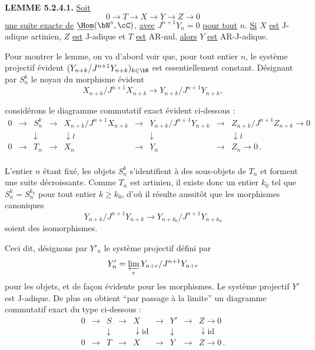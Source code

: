 \noindent
\textbf{LEMME 5.2.4.1.} \underline{Soit}
\[
0 \longrightarrow T \longrightarrow X \longrightarrow Y \longrightarrow Z \longrightarrow 0
\]
\underline{une suite exacte de} $\underline{\Hom}(\bN^{\circ}, \cC)$, \underline{avec} $J^{n+1}Y_n = 0$ \underline{pour tout} $n$. \underline{Si} $X$ \underline{est} J-adique artinien, $Z$ \underline{est} J-adique et $T$ \underline{est} AR-nul, \underline{alors} $Y$ \underline{est} AR-J-adique.

Pour montrer le lemme, on va d'abord voir que, pour tout entier $n$, le syst\`eme projectif \'evident $(Y_{n+k}/J^{n+1}Y_{n+k})_{k \in \bN}$ est essentiellement constant. D\'esignant par $S_n^k$ le noyau du morphisme \'evident
\[
X_{n+k}/J^{n+1}X_{n+k} \longrightarrow Y_{n+k}/J^{n+1}Y_{n+k},
\]

\newpage

consid\'erons le diagramme commutatif exact \'evident ci-dessous :
\[
\begin{array}{ccccccccc}
0 & \longrightarrow & S_n^k & \longrightarrow & X_{n+k}/J^{n+1}X_{n+k} & \longrightarrow & Y_{n+k}/J^{n+1}Y_{n+k} & \longrightarrow & Z_{n+k}/J^{n+1}Z_{n+k} \longrightarrow 0 \\
  &                 & \downarrow &              & \downarrow{\wr} &              & \downarrow &              & \downarrow{\wr} \\
0 & \longrightarrow & T_n & \longrightarrow & X_n & \longrightarrow & Y_n & \longrightarrow & Z_n \longrightarrow 0\,. \\
\end{array}
\]

L'entier $n$ \'etant fix\'e, les objets $S_n^k$ s'identifient \`a des sous-objets de $T_n$ et forment une suite d\'ecroissante. Comme $T_n$ est artinien, il existe donc un entier $k_0$ tel que $S_n^k = S_n^{k_0}$ pour tout entier $k \geq k_0$, d'o\`u il r\'esulte aussit\^ot que les morphismes canoniques
\[
Y_{n+k}/J^{n+1}Y_{n+k} \longrightarrow Y_{n+k_0}/J^{n+1}Y_{n+k_0}
\]
soient des isomorphismes.

Ceci dit, d\'esignons par $Y'_n$ le syst\`eme projectif d\'efini par
\[
Y'_n = \varprojlim_{r} Y_{n+r}/J^{n+1}Y_{n+r}
\]
pour les objets, et de fa\c con \'evidente pour les morphismes. Le syst\`eme projectif $Y'$ est J-adique. De plus on obtient ``par passage \`a la limite'' un diagramme commutatif exact du type ci-dessous :
\[
\begin{array}{ccccccccc}
0 & \longrightarrow & S & \longrightarrow & X & \longrightarrow & Y' & \longrightarrow & Z \longrightarrow 0 \\
  &                 & \downarrow &              & \downarrow{\mathrm{id}} &     & \downarrow &              & \downarrow{\mathrm{id}} \\
0 & \longrightarrow & T & \longrightarrow & X & \longrightarrow & Y & \longrightarrow & Z \longrightarrow 0\,. \\
\end{array}
\]

